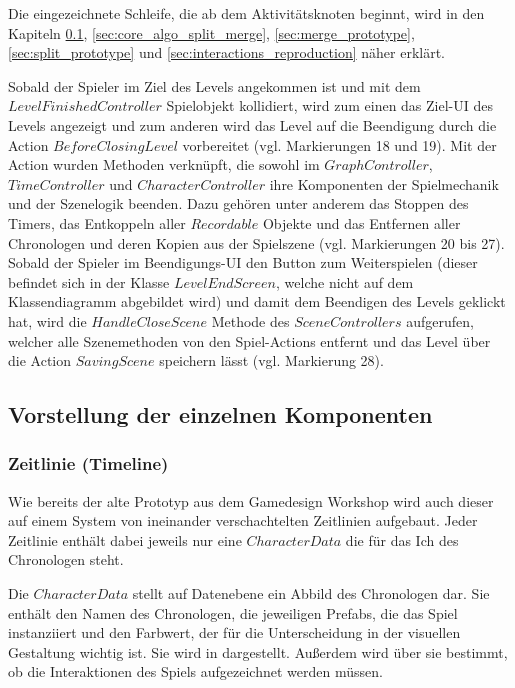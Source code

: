 Die eingezeichnete Schleife, die ab dem Aktivitätsknoten  beginnt, wird in den Kapiteln \ref{sec:components}, \ref{sec:core_algo_split_merge}, \ref{sec:merge_prototype}, \ref{sec:split_prototype} und \ref{sec:interactions_reproduction} näher erklärt.

Sobald der Spieler im Ziel des Levels angekommen ist und mit dem \\ $LevelFinishedController$ Spielobjekt kollidiert, wird zum einen das Ziel-\ac{UI} des Levels angezeigt und zum anderen wird das Level auf die Beendigung durch die Action $BeforeClosingLevel$ vorbereitet (vgl. Markierungen 18 und 19). Mit der Action wurden Methoden verknüpft, die sowohl im $GraphController$, $TimeController$ und $CharacterController$ ihre Komponenten der Spielmechanik und der Szenelogik beenden. Dazu gehören unter anderem das Stoppen des Timers, das Entkoppeln aller $Recordable$ Objekte und das Entfernen aller Chronologen und deren Kopien aus der Spielszene (vgl. Markierungen 20 bis 27). Sobald der Spieler im Beendigungs-\ac{UI} den Button zum Weiterspielen (dieser befindet sich in der Klasse $LevelEndScreen$, welche nicht auf dem Klassendiagramm abgebildet wird) und damit dem Beendigen des Levels geklickt hat, wird die $HandleCloseScene$ Methode des $SceneControllers$ aufgerufen, welcher alle Szenemethoden von den Spiel-Actions entfernt und das Level über die Action $SavingScene$ speichern lässt (vgl. Markierung 28).

\subsection{Vorstellung der einzelnen Komponenten}\label{sec:components}
\subsubsection{Zeitlinie (Timeline)}
Wie bereits der alte Prototyp aus dem Gamedesign Workshop wird auch dieser auf einem System von ineinander verschachtelten Zeitlinien aufgebaut. Jeder Zeitlinie enthält dabei jeweils nur eine $CharacterData$ die für das Ich des Chronologen steht.

Die $CharacterData$ stellt auf Datenebene ein Abbild des Chronologen dar. Sie enthält den Namen des Chronologen, die jeweiligen Prefabs, die das Spiel instanziiert und den Farbwert, der für die Unterscheidung in der visuellen Gestaltung wichtig ist. Sie wird in  dargestellt. Außerdem wird über sie bestimmt, ob die Interaktionen des Spiels aufgezeichnet werden müssen.

